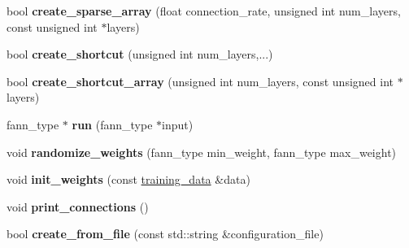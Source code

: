 \begin{DoxyCompactItemize}
\item 
\hypertarget{class_f_a_n_n_1_1neural__net_a79ad6399ac33194c40497d593b5bbd7d}{bool {\bfseries create\-\_\-sparse\-\_\-array} (float connection\-\_\-rate, unsigned int num\-\_\-layers, const unsigned int $\ast$layers)}\label{class_f_a_n_n_1_1neural__net_a79ad6399ac33194c40497d593b5bbd7d}

\item 
\hypertarget{class_f_a_n_n_1_1neural__net_ae9bddeafe1efda270491ab635d7802ad}{bool {\bfseries create\-\_\-shortcut} (unsigned int num\-\_\-layers,...)}\label{class_f_a_n_n_1_1neural__net_ae9bddeafe1efda270491ab635d7802ad}

\item 
\hypertarget{class_f_a_n_n_1_1neural__net_af25565fd427d7585ecfe10ad2780551b}{bool {\bfseries create\-\_\-shortcut\-\_\-array} (unsigned int num\-\_\-layers, const unsigned int $\ast$layers)}\label{class_f_a_n_n_1_1neural__net_af25565fd427d7585ecfe10ad2780551b}

\item 
\hypertarget{class_f_a_n_n_1_1neural__net_ad4848876abc25f6e0fee3c6efc901fa3}{fann\-\_\-type $\ast$ {\bfseries run} (fann\-\_\-type $\ast$input)}\label{class_f_a_n_n_1_1neural__net_ad4848876abc25f6e0fee3c6efc901fa3}

\item 
\hypertarget{class_f_a_n_n_1_1neural__net_a567a6daa3b234d5a8d12d86953391836}{void {\bfseries randomize\-\_\-weights} (fann\-\_\-type min\-\_\-weight, fann\-\_\-type max\-\_\-weight)}\label{class_f_a_n_n_1_1neural__net_a567a6daa3b234d5a8d12d86953391836}

\item 
\hypertarget{class_f_a_n_n_1_1neural__net_a07ffec56874eb4cd866075ebcbb7ede3}{void {\bfseries init\-\_\-weights} (const \hyperlink{class_f_a_n_n_1_1training__data}{training\-\_\-data} \&data)}\label{class_f_a_n_n_1_1neural__net_a07ffec56874eb4cd866075ebcbb7ede3}

\item 
\hypertarget{class_f_a_n_n_1_1neural__net_a5ea5f8825a83930cd6f7d76c992ce6d5}{void {\bfseries print\-\_\-connections} ()}\label{class_f_a_n_n_1_1neural__net_a5ea5f8825a83930cd6f7d76c992ce6d5}

\item 
\hypertarget{class_f_a_n_n_1_1neural__net_a9209c58df21a617fa52ccd20736403b6}{bool {\bfseries create\-\_\-from\-\_\-file} (const std\-::string \&configuration\-\_\-file)}\label{class_f_a_n_n_1_1neural__net_a9209c58df21a617fa52ccd20736403b6}


\end{DoxyCompactItemize}

